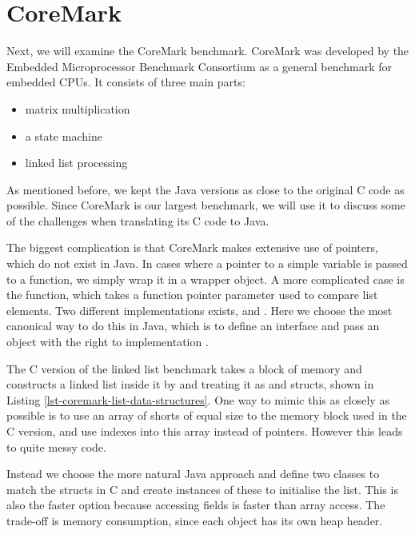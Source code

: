 \section{CoreMark}
\label{sec-evaluation-coremark}

Next, we will examine the CoreMark benchmark. CoreMark was developed by the Embedded Microprocessor Benchmark Consortium as a general benchmark for embedded CPUs. It consists of three main parts:
\begin{itemize}
  \item matrix multiplication
  \item a state machine
  \item linked list processing
\end{itemize}

As mentioned before, we kept the Java versions as close to the original C code as possible. Since CoreMark is our largest benchmark, we will use it to discuss some of the challenges when translating its C code to Java.

The biggest complication is that CoreMark makes extensive use of pointers, which do not exist in Java. In cases where a pointer to a simple variable is passed to a function, we simply wrap it in a wrapper object. A more complicated case is the  function, which takes a function pointer parameter  used to compare list elements. Two different implementations exists,  and . Here we choose the most canonical way to do this in Java, which is to define an interface and pass an object with the right to implementation .

The C version of the linked list benchmark takes a block of memory and constructs a linked list inside it by and treating it as  and  structs, shown in Listing \ref{lst-coremark-list-data-structures}. One way to mimic this as closely as possible is to use an array of shorts of equal size to the memory block used in the C version, and use indexes into this array instead of pointers. However this leads to quite messy code.

Instead we choose the more natural Java approach and define two classes to match the structs in C and create instances of these to initialise the list. This is also the faster option because accessing fields is faster than array access. The trade-off is memory consumption, since each object has its own heap header.


